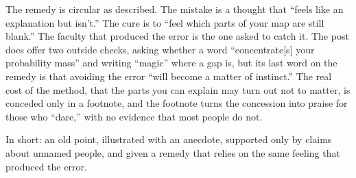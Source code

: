 \begin{afterword}
The remedy is circular as described. The mistake is a thought that ``feels like an explanation but isn't.'' The cure is to ``feel which parts of your map are still blank.'' The faculty that produced the error is the one asked to catch it. The post does offer two outside checks, asking whether a word ``concentrate[s] your probability mass'' and writing ``magic'' where a gap is, but its last word on the remedy is that avoiding the error ``will become a matter of instinct.'' The real cost of the method, that the parts you can explain may turn out not to matter, is conceded only in a footnote, and the footnote turns the concession into praise for those who ``dare,'' with no evidence that most people do not.

In short: an old point, illustrated with an anecdote, supported only by claims about unnamed people, and given a remedy that relies on the same feeling that produced the error.
\end{afterword}
